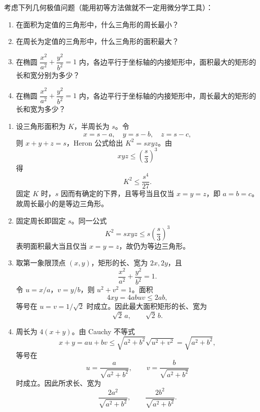 \begin{xexercise}[7]
考虑下列几何极值问题（能用初等方法做就不一定用微分学工具）：
  \begin{enumerate}[label=(\arabic*)]
    \item 在面积为定值的三角形中，什么三角形的周长最小？
    \item 在周长为定值的三角形中，什么三角形的面积最大？
    \item 在椭圆 $\dfrac{x^2}{a^2}+\dfrac{y^2}{b^2}=1$ 内，各边平行于坐标轴的内接矩形中，面积最大的矩形的长和宽分别为多少？
    \item 在椭圆 $\dfrac{x^2}{a^2}+\dfrac{y^2}{b^2}=1$ 内，各边平行于坐标轴的内接矩形中，周长最大的矩形的长和宽为多少？
  \end{enumerate}
\end{xexercise}
\begin{xsolution}
\begin{enumerate}[label=(\arabic*)]
  \item 设三角形面积为 $K$，半周长为 $s$。令
  \[
    x=s-a,\quad y=s-b,\quad z=s-c,
  \]
  则 $x+y+z=s$，Heron 公式给出 $K^2=sxyz$。由
  \[
    xyz\le\left(\frac s3\right)^3
  \]
  得
  \[
    K^2\le\frac{s^4}{27}.
  \]
  固定 $K$ 时，$s$ 因而有确定的下界，且等号当且仅当 $x=y=z$，即 $a=b=c$。故周长最小的是等边三角形。

  \item 固定周长即固定 $s$。同一公式
  \[
    K^2=sxyz\le s\left(\frac s3\right)^3
  \]
  表明面积最大当且仅当 $x=y=z$，故仍为等边三角形。

  \item 取第一象限顶点 $(x,y)$，矩形的长、宽为 $2x,2y$，且
  \[
    \frac{x^2}{a^2}+\frac{y^2}{b^2}=1.
  \]
  令 $u=x/a$，$v=y/b$，则 $u^2+v^2=1$。面积
  \[
    4xy=4abuv\le2ab,
  \]
  等号在 $u=v=1/\sqrt2$ 时成立。因此最大面积矩形的长、宽为
  \[
    \boxed{\sqrt2\,a,\qquad \sqrt2\,b}.
  \]

  \item 周长为 $4(x+y)$。由 Cauchy 不等式
  \[
    x+y=au+bv\le\sqrt{a^2+b^2}\sqrt{u^2+v^2}=\sqrt{a^2+b^2},
  \]
  等号在
  \[
    u=\frac a{\sqrt{a^2+b^2}},\qquad
    v=\frac b{\sqrt{a^2+b^2}}
  \]
  时成立。因此所求长、宽为
  \[
    \boxed{
    \frac{2a^2}{\sqrt{a^2+b^2}},\qquad
    \frac{2b^2}{\sqrt{a^2+b^2}}}.
  \]
\end{enumerate}
\end{xsolution}


